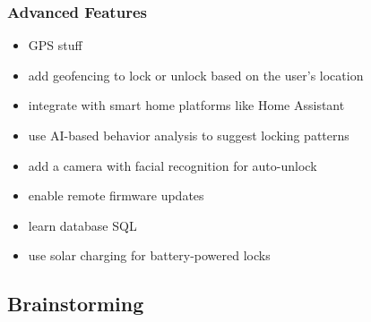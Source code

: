 \subsubsection*{Advanced Features}
\begin{itemize}
    \item GPS stuff
    \item add geofencing to lock or unlock based on the user's location
    \item integrate with smart home platforms like Home Assistant
    \item use AI-based behavior analysis to suggest locking patterns
    \item add a camera with facial recognition for auto-unlock
    \item enable remote firmware updates
    \item learn database SQL
    \item use solar charging for battery-powered locks
\end{itemize}







\subsection{Brainstorming}

